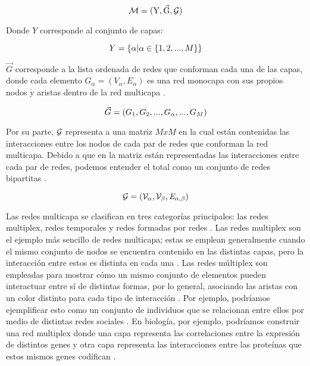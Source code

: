 \documentclass[
]{book}
\begin{document}
\[\cal{M}=\mathrm{(Y,\vec{G},\cal{G})}\]

Donde \(Y\) corresponde al conjunto de capas:

\[Y=\left \{ \alpha | \alpha \in \left \{ 1, 2, ... \space ,M \right \} \right \}\]

\(\vec{G}\) corresponde a la lista ordenada de redes que conforman cada una de las capas, donde cada elemento \(G_{\alpha}=(V_{\alpha}, E_{\alpha})\) es una red monocapa con sus propios nodos y aristas dentro de la red multicapa \citep{buldyrev2010catastrophic}.

\[\vec{G} = (G_{1}, G_{2}, ... \space , G_{\alpha }, ... \space , G_{M})\]

Por su parte, \(\cal{G}\) representa a una matriz \(MxM\) en la cual están contenidas las interacciones entre los nodos de cada par de redes que conforman la red multicapa. Debido a que en la matriz están representadas las interacciones entre cada par de redes, podemos entender el total como un conjunto de redes bipartitas \citep{buldyrev2010catastrophic}.

\[\cal{G} = (V_{\alpha},V_{\beta},\mathit{E_{\alpha, \beta}} )\]

Las redes multicapa se clasifican en tres categorías principales: las redes multiplex, redes temporales y redes formadas por redes \citep{bianconi2018multilayer}. Las redes multiplex son el ejemplo más sencillo de redes multicapa; estas se emplean generalmente cuando el mismo conjunto de nodos se encuentra contenido en las distintas capas, pero la interacción entre estos es distinta en cada una \citep{bianconi2018multilayer}. Las redes múltiplex son empleadas para mostrar cómo un mismo conjunto de elementos pueden interactuar entre sí de distintas formas, por lo general, asociando las aristas con un color distinto para cada tipo de interacción \citep{kanawati2015multiplex}. Por ejemplo, podríamos ejemplificar esto como un conjunto de individuos que se relacionan entre ellos por medio de distintas redes sociales \citep{aleta2019multilayer}. En biología, por ejemplo, podríamos construir una red multiplex donde una capa representa las correlaciones entre la expresión de distintos genes y otra capa representa las interacciones entre las proteínas que estos mismos genes codifican \citep{arda2019multiplex}.
\end{document}
